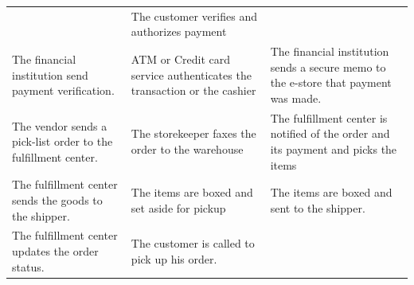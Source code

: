 \documentclass[]{book}
\begin{document}
\begin{longtable}[]{@{}lll@{}}
\begin{minipage}[t]{0.38\columnwidth}
\end{minipage} & \begin{minipage}[t]{0.38\columnwidth}\raggedright
The customer verifies and authorizes payment\strut
\end{minipage}\tabularnewline
\begin{minipage}[t]{0.15\columnwidth}\raggedright
The financial institution send payment verification.\strut
\end{minipage} & \begin{minipage}[t]{0.38\columnwidth}\raggedright
ATM or Credit card service authenticates the transaction or the cashier\strut
\end{minipage} & \begin{minipage}[t]{0.38\columnwidth}\raggedright
The financial institution sends a secure memo to the e-store that payment was made.\strut
\end{minipage}\tabularnewline
\begin{minipage}[t]{0.15\columnwidth}\raggedright
The vendor sends a pick-list order to the fulfillment center.\strut
\end{minipage} & \begin{minipage}[t]{0.38\columnwidth}\raggedright
The storekeeper faxes the order to the warehouse\strut
\end{minipage} & \begin{minipage}[t]{0.38\columnwidth}\raggedright
The fulfillment center is notified of the order and its payment and picks the items\strut
\end{minipage}\tabularnewline
\begin{minipage}[t]{0.15\columnwidth}\raggedright
The fulfillment center sends the goods to the shipper.\strut
\end{minipage} & \begin{minipage}[t]{0.38\columnwidth}\raggedright
The items are boxed and set aside for pickup\strut
\end{minipage} & \begin{minipage}[t]{0.38\columnwidth}\raggedright
The items are boxed and sent to the shipper.\strut
\end{minipage}\tabularnewline
\begin{minipage}[t]{0.15\columnwidth}\raggedright
The fulfillment center updates the order status.\strut
\end{minipage} & \begin{minipage}[t]{0.38\columnwidth}\raggedright
The customer is called to pick up his order.\strut
\end{minipage} & \begin{minipage}[t]{0.38\columnwidth}\raggedright

\end{minipage}
\end{longtable}
\end{document}
